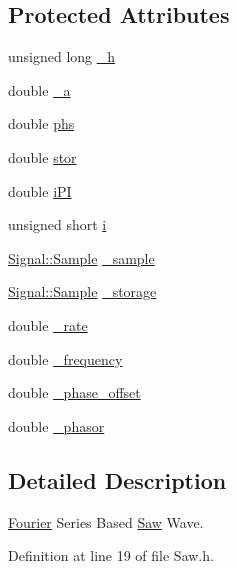 \subsection*{Protected Attributes}
\begin{DoxyCompactItemize}
\item 
unsigned long \hyperlink{classDSG_1_1Fourier_1_1Saw_a1e328725e1b0857c8e8bcb6b852b5cc0}{\-\_\-h}
\item 
double \hyperlink{classDSG_1_1Fourier_1_1Saw_a02fdf54a38f33ecc003863aad447e88a}{\-\_\-a}
\item 
double \hyperlink{classDSG_1_1Fourier_1_1Saw_a09a244f75987cb7903eeeabf2abe5245}{phs}
\item 
double \hyperlink{classDSG_1_1Fourier_1_1Saw_adb8e1058711aa912512e8ae6343c3392}{stor}
\item 
double \hyperlink{classDSG_1_1Fourier_1_1Saw_afeeaf783a6098cb747b8ab6560e6e24e}{i\-P\-I}
\item 
unsigned short \hyperlink{classDSG_1_1Fourier_1_1Saw_a49dc2b9a40a17a4d239f72750e368cb9}{i}
\item 
\hyperlink{classDSG_1_1Signal_1_1Sample}{Signal\-::\-Sample} \hyperlink{classDSG_1_1Fourier_1_1FourierGenerator_aaf63683d2173cd41ff1d65b4c454e87a}{\-\_\-sample}
\item 
\hyperlink{classDSG_1_1Signal_1_1Sample}{Signal\-::\-Sample} \hyperlink{classDSG_1_1Fourier_1_1FourierGenerator_a43799227375e2d8b1354682e3a4fc935}{\-\_\-storage}
\item 
double \hyperlink{classDSG_1_1SignalGenerator_aa10f6c85d9adee901139ea7fb346f39d}{\-\_\-rate}
\item 
double \hyperlink{classDSG_1_1SignalGenerator_a67e296e3506dcdf09402c667cddff9ac}{\-\_\-frequency}
\item 
double \hyperlink{classDSG_1_1SignalGenerator_a9abf9d00c798e0fdca6314f17547758a}{\-\_\-phase\-\_\-offset}
\item 
double \hyperlink{classDSG_1_1SignalGenerator_ac2271b582bf699275f077ecb642a8cd9}{\-\_\-phasor}
\end{DoxyCompactItemize}


\subsection{Detailed Description}
\hyperlink{namespaceDSG_1_1Fourier}{Fourier} Series Based \hyperlink{classDSG_1_1Fourier_1_1Saw}{Saw} Wave. 

Definition at line 19 of file Saw.\-h.



